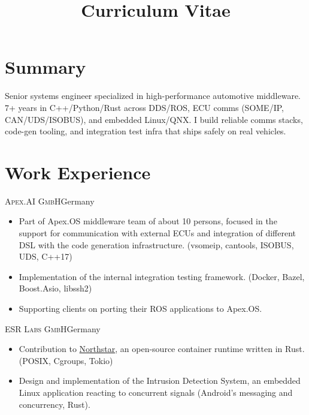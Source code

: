 \documentclass[10pt]{moderncv}
\title{Curriculum Vitae}
\begin{document}
\maketitle
\vspace*{-1cm}

\section{Summary}


Senior systems engineer specialized in high-performance automotive middleware. 7+ years in C++/Python/Rust across DDS/ROS, ECU
comms (SOME/IP, CAN/UDS/ISOBUS), and embedded Linux/QNX. I build reliable comms stacks, code-gen tooling, and integration test
infra that ships safely on real vehicles.

\section{Work Experience}

{\textsc{Apex.AI GmbH}}{Germany}{}{%
\begin{itemize}
    \item Part of Apex.OS middleware team of about 10 persons, focused in the support for communication with external ECUs and
        integration of different DSL with the code generation infrastructure. (vsomeip, cantools, ISOBUS, UDS, C++17)
    \item Implementation of the internal integration testing framework. (Docker, Bazel, Boost.Asio, libssh2)
    \item Supporting clients on porting their ROS applications to Apex.OS.
\end{itemize}
}

{\textsc{ESR Labs GmbH}}{Germany}{}{%
\begin{itemize}
    \item Contribution to \href{https://github.com/esrlabs/northstar}{Northstar}, an open-source container runtime written in
        Rust. (POSIX, Cgroups, Tokio)
    \item Design and implementation of the Intrusion Detection System, an embedded Linux application reacting to concurrent
        signals (Android's messaging and concurrency, Rust).
\end{itemize}
}
\end{document}

